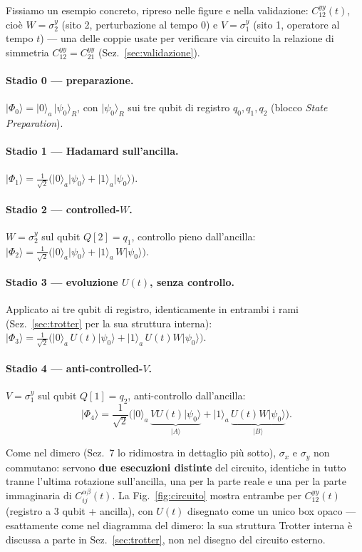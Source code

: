 \documentclass[11pt,a4paper]{article}
\newcommand{\ket}[1]{\lvert #1\rangle}
\begin{document}
Fissiamo un esempio concreto, ripreso nelle figure e nella validazione:
$C_{12}^{yy}(t)$, cioè $W=\sigma_2^y$ (sito 2, perturbazione al tempo $0$) e $V=\sigma_1^y$ (sito
1, operatore al tempo $t$) --- una delle coppie usate per verificare via circuito la relazione di
simmetria $C_{12}^{yy}=C_{21}^{yy}$ (Sez.~\ref{sec:validazione}).

\paragraph{Stadio 0 --- preparazione.} $\ket{\Phi_0}=\ket0_a\,\ket{\psi_0}_R$, con
$\ket{\psi_0}_R$ sui tre qubit di registro $q_0,q_1,q_2$ (blocco \emph{State Preparation}).

\paragraph{Stadio 1 --- Hadamard sull'ancilla.}
$\ket{\Phi_1}=\tfrac{1}{\sqrt2}\big(\ket0_a\ket{\psi_0}+\ket1_a\ket{\psi_0}\big)$.

\paragraph{Stadio 2 --- controlled-$W$.} $W=\sigma_2^y$ sul qubit $Q[2]=q_1$, controllo pieno
dall'ancilla:
$\ket{\Phi_2}=\tfrac{1}{\sqrt2}\big(\ket0_a\ket{\psi_0}+\ket1_a\,W\ket{\psi_0}\big)$.

\paragraph{Stadio 3 --- evoluzione $U(t)$, senza controllo.} Applicato ai tre qubit di registro,
identicamente in entrambi i rami (Sez.~\ref{sec:trotter} per la sua struttura interna):
$\ket{\Phi_3}=\tfrac{1}{\sqrt2}\big(\ket0_a\,U(t)\ket{\psi_0}+\ket1_a\,U(t)W\ket{\psi_0}\big)$.

\paragraph{Stadio 4 --- anti-controlled-$V$.} $V=\sigma_1^y$ sul qubit $Q[1]=q_2$,
anti-controllo dall'ancilla:
\begin{equation}
\boxed{\;\ket{\Phi_4}=\frac{1}{\sqrt2}\Big(\ket0_a\,\underbrace{VU(t)\ket{\psi_0}}_{\ket A}
+\ket1_a\,\underbrace{U(t)W\ket{\psi_0}}_{\ket B}\Big).}
\label{eq:phi4}
\end{equation}

Come nel dimero (Sez.~7 lo ridimostra in dettaglio più sotto), $\sigma_x$ e $\sigma_y$ non
commutano: servono \textbf{due esecuzioni distinte} del circuito, identiche in tutto tranne
l'ultima rotazione sull'ancilla, una per la parte reale e una per la parte immaginaria di
$C_{ij}^{\alpha\beta}(t)$. La Fig.~\ref{fig:circuito} mostra entrambe per $C_{12}^{yy}(t)$
(registro a 3 qubit + ancilla), con $U(t)$ disegnato come un unico box opaco --- esattamente come
nel diagramma del dimero: la sua struttura Trotter interna è discussa a parte in
Sez.~\ref{sec:trotter}, non nel disegno del circuito esterno.
\end{document}
